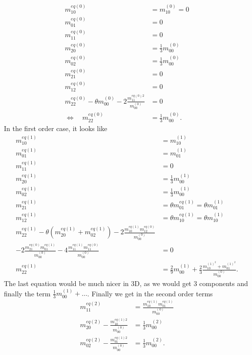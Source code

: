 \begin{align}
  \label{eq: eq moments 10_0}
  m_{10}^{eq(0)} & = m_{10}^{(0)} = 0
  \\
  \label{eq: eq moments 01_0}
  m_{01}^{eq(0)} & = 0
  \\
  \label{eq: eq moments 11_0}
  m_{11}^{eq(0)} & = 0
  \\
  \label{eq: eq moments 20_0}
  m_{20}^{eq(0)} & = \frac{1}{3} m_{00}^{(0)}
  \\
  \label{eq: eq moments 02_0}
  m_{02}^{eq(0)} & = \frac{1}{3} m_{00}^{(0)}
  \\
  \label{eq: eq moments 21_0}
  m_{21}^{eq(0)} & = 0
  \\
  \label{eq: eq moments 12_0}
  m_{12}^{eq(0)} & = 0
  \\
  \label{eq: eq moments 22_0}
  m_{22}^{eq(0)} - \theta m_{00}^{(0)} - 2\frac{ m_{11}^{eq(0)2}}{m_{00}^{(0)}} & = 0
  \\\nonumber
  \Leftrightarrow\quad m_{22}^{eq(0)} &= \frac{1}{3} m_{00}^{(0)}.
\end{align}
In the first order case, it looks like
\begin{align}
  \label{eq: eq moments 10_1}
  m_{10}^{eq(1)} & = m_{10}^{(1)}
  \\
  \label{eq: eq moments 01_1}
  m_{01}^{eq(1)} & = m_{01}^{(1)}
  \\
  \label{eq: eq moments 11_1}
  m_{11}^{eq(1)} & = 0
  \\
  \label{eq: eq moments 20_1}
  m_{20}^{eq(1)} & = \frac{1}{3} m_{00}^{(1)}
  \\
  \label{eq: eq moments 02_1}
  m_{02}^{eq(1)} & = \frac{1}{3} m_{00}^{(1)}
  \\
  \label{eq: eq moments 21_1}
  m_{21}^{eq(1)} & = \theta m_{01}^{eq(1)} = \theta m_{01}^{(1)}
  \\
  \label{eq: eq moments 12_1}
  m_{12}^{eq(1)} & = \theta m_{10}^{eq(1)} = \theta m_{10}^{(1)}
  \\
  \label{eq: eq moments 22_1}
  m_{22}^{eq(1)} - \theta (m_{20}^{eq(1)} + m_{02}^{eq(1)})
  - 2\frac{ m_{10}^{eq(1)} m_{12}^{eq(0)} }{m_{00}^{(0)}}&
  \\\nonumber
  - 2\frac{ m_{21}^{eq(0)} m_{01}^{eq(1)} }{m_{00}^{(0)}}
  - 4\frac{ m_{11}^{eq(1)} m_{11}^{eq(0)} }{m_{00}^{(0)}}&=0
  \\\nonumber
  m_{22}^{eq(1)} &= \frac{2}{9} m_{00}^{(1)}
  + \frac{2}{3}\frac{  m_{10}^{{(1)}^2} +m_{01}^{{(1)}^2} }{m_{00}^{(0)}}.
\end{align}
The last equation would be much nicer in 3D, as we would get 3 components and finally the term $\frac{1}{3} m_{00}^{(1)} + \ldots$.
Finally we get in the second order terms
\begin{align}
    \label{eq: eq moments 11_2}
    m_{11}^{eq(2)} & = \frac{ m_{10}^{eq(1)}m_{01}^{eq(1)}}{m_{00}^{(0)}}
    \\
    \label{eq: eq moments 20_2}
    m_{20}^{eq(2)} - \frac{ m_{10}^{eq(1)2}}{m_{00}^{(0)}} & = \frac{1}{3} m_{00}^{(2)}
    \\
    \label{eq: eq moments 02_2}
    m_{02}^{eq(2)} - \frac{ m_{01}^{eq(1)2}}{m_{00}^{(0)}} & = \frac{1}{3} m_{00}^{(2)}.
\end{align}
